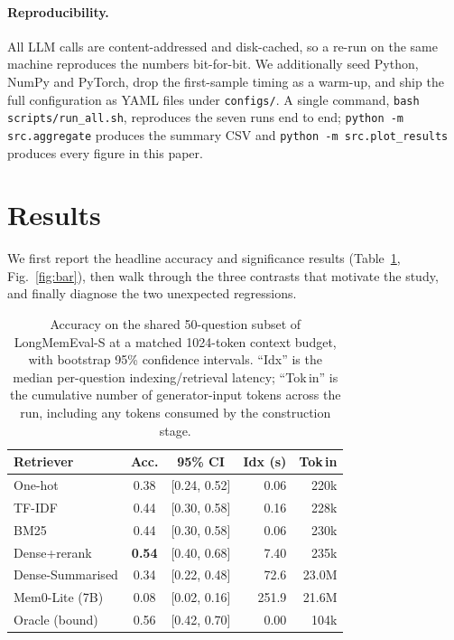 \documentclass[11pt]{article}
\begin{document}
\paragraph{Reproducibility.}
All LLM calls are content-addressed and disk-cached, so a re-run on
the same machine reproduces the numbers bit-for-bit. We additionally
seed Python, NumPy and PyTorch, drop the first-sample timing as a
warm-up, and ship the full configuration as YAML files under
\texttt{configs/}. A single command,
\texttt{bash scripts/run\_all.sh}, reproduces the seven runs end to
end; \texttt{python -m src.aggregate} produces the summary CSV and
\texttt{python -m src.plot\_results} produces every figure in this
paper.

\section{Results}
\label{sec:results}

We first report the headline accuracy and significance results
(Table~\ref{tab:results}, Fig.~\ref{fig:bar}), then walk through the
three contrasts that motivate the study, and finally diagnose the
two unexpected regressions.

\begin{table}[t]
\centering
\footnotesize
\setlength{\tabcolsep}{4pt}
\renewcommand{\arraystretch}{1.15}
\begin{tabular}{@{}l c c r r@{}}
\toprule
\textbf{Retriever} & \textbf{Acc.} & \textbf{95\% CI} & \textbf{Idx (s)} & \textbf{Tok\,in} \\
\midrule
One-hot              & 0.38          & {\scriptsize[0.24, 0.52]} &   0.06 & 220k   \\
TF-IDF               & 0.44          & {\scriptsize[0.30, 0.58]} &   0.16 & 228k   \\
BM25                 & 0.44          & {\scriptsize[0.30, 0.58]} &   0.06 & 230k   \\
Dense+rerank         & \textbf{0.54} & {\scriptsize[0.40, 0.68]} &   7.40 & 235k   \\
Dense-Summarised     & 0.34          & {\scriptsize[0.22, 0.48]} &  72.6  & 23.0M  \\
Mem0-Lite (7B)       & 0.08          & {\scriptsize[0.02, 0.16]} & 251.9  & 21.6M  \\
\midrule
Oracle (bound)       & 0.56          & {\scriptsize[0.42, 0.70]} &   0.00 & 104k   \\
\bottomrule
\end{tabular}
\caption{Accuracy on the shared 50-question subset of LongMemEval-S
at a matched 1024-token context budget, with bootstrap 95\%
confidence intervals. ``Idx'' is the median per-question
indexing/retrieval latency; ``Tok\,in'' is the cumulative number of
generator-input tokens across the run, including any tokens consumed
by the construction stage.}
\label{tab:results}
\end{table}
\end{document}
